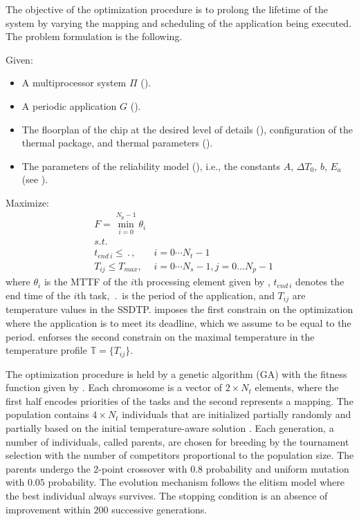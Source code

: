 The objective of the optimization procedure is to prolong the lifetime of the system by varying the mapping and scheduling of the application being executed. The problem formulation is the following.

Given:

\begin{itemize}
  \item A multiprocessor system $\Pi$ ().
  \item A periodic application $G$ ().
  \item The floorplan of the chip at the desired level of details (), configuration of the thermal package, and thermal parameters ().
  \item The parameters of the reliability model (), i.e., the constants $A$, $\Delta T_0$, $b$, $E_a$ (see ).
\end{itemize}

Maximize:
\begin{align}
  & F = \min_{i = 0}^{N_p - 1} \theta_i \label{eq:fitness-function} \\
  & s.t. \nonumber \\
  & t_{end \: i} \leq \period, & i = 0 \cdots N_t - 1 \label{eq:deadline} \\
  & T_{ij} \leq T_{max},       & i = 0 \cdots N_s - 1, j = 0 \dots N_p - 1 \label{eq:t-max}
\end{align}
where $\theta_i$ is the MTTF of the $i$th processing element given by , $t_{end \: i}$ denotes the end time of the $i$th task, $\period$ is the period of the application, and $T_{ij}$ are temperature values in the SSDTP.  imposes the first constrain on the optimization where the application is to meet its deadline, which we assume to be equal to the period.  enforses the second constrain on the maximal temperature in the temperature profile $\mathbb{T} = \{ T_{ij} \}$.

The optimization procedure is held by a genetic algorithm (GA) \cite{schmitz2004} with the fitness function given by . Each chromosome is a vector of $2 \times N_t$ elements, where the first half encodes priorities of the tasks and the second represents a mapping. The population contains $4 \times N_t$ individuals that are initialized partially randomly and partially based on the initial temperature-aware solution \cite{xie2006}. Each generation, a number of individuals, called parents, are chosen for breeding by the tournament selection with the number of competitors proportional to the population size. The parents undergo the 2-point crossover with $0.8$ probability and uniform mutation with $0.05$ probability. The evolution mechanism follows the elitism model where the best individual always survives. The stopping condition is an absence of improvement within $200$ successive generations.

